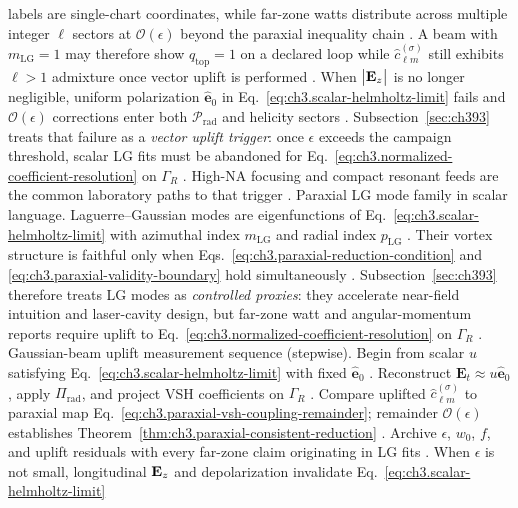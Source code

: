 labels are single-chart coordinates, while far-zone watts distribute across multiple integer \(\ell\) sectors at \(\mathcal{O}(\epsilon)\) beyond
the paraxial inequality chain \cite{hansen1988}. A beam with \(m_{\mathrm{LG}}=1\) may therefore show \(q_{\mathrm{top}}=1\) on a
declared loop while \(\widehat{c}_{\ell m}^{(\sigma)}\) still exhibits \(\ell>1\) admixture once vector uplift is performed
\cite{allen1992}.
When \(\bigl|\mathbf{E}_{z}\bigr|\) is no longer negligible, uniform polarization \(\hat{\mathbf{e}}_{0}\) in Eq.~\eqref{eq:ch3.scalar-helmholtz-limit} fails
and \(\mathcal{O}(\epsilon)\) corrections enter both \(\mathcal{P}_{\mathrm{rad}}\) and helicity sectors \cite{jackson1999}.
Subsection~\ref{sec:ch393} treats that failure as a \emph{vector uplift trigger}: once \(\epsilon\) exceeds the campaign threshold, scalar LG fits must
be abandoned for Eq.~\eqref{eq:ch3.normalized-coefficient-resolution} on \(\Gamma_R\) \cite{hansen1988}. High-NA focusing and compact
resonant feeds are the common laboratory paths to that trigger \cite{stratton1941}.
Paraxial LG mode family in scalar language. Laguerre--Gaussian modes are eigenfunctions of Eq.~\eqref{eq:ch3.scalar-helmholtz-limit} with azimuthal index \(m_{\mathrm{LG}}\) and radial index
\(p_{\mathrm{LG}}\) \cite{allen1992}. Their vortex structure is faithful only when Eqs.~\eqref{eq:ch3.paraxial-reduction-condition} and
\eqref{eq:ch3.paraxial-validity-boundary} hold simultaneously \cite{allen1992}. Subsection~\ref{sec:ch393} therefore treats LG modes as
\emph{controlled proxies}: they accelerate near-field intuition and laser-cavity design, but far-zone watt and angular-momentum reports require uplift to
Eq.~\eqref{eq:ch3.normalized-coefficient-resolution} on \(\Gamma_R\) \cite{hansen1988}.
Gaussian-beam uplift measurement sequence (stepwise). Begin from scalar \(u\) satisfying Eq.~\eqref{eq:ch3.scalar-helmholtz-limit} with fixed \(\hat{\mathbf{e}}_{0}\) \cite{stratton1941}.
Reconstruct \(\mathbf{E}_{t}\approx u\hat{\mathbf{e}}_{0}\), apply \(\Pi_{\mathrm{rad}}\), and project VSH coefficients on \(\Gamma_R\)
\cite{harrington2001}. Compare uplifted \(\widehat{c}_{\ell m}^{(\sigma)}\) to paraxial map
Eq.~\eqref{eq:ch3.paraxial-vsh-coupling-remainder}; remainder \(\mathcal{O}(\epsilon)\) establishes Theorem~\ref{thm:ch3.paraxial-consistent-reduction}
\cite{allen1992}. Archive \(\epsilon\), \(w_{0}\), \(f\), and uplift residuals with every far-zone claim originating in LG fits
\cite{jackson1999}.
When \(\epsilon\) is not small, longitudinal \(\mathbf{E}_{z}\) and depolarization invalidate Eq.~\eqref{eq:ch3.scalar-helmholtz-limit}
